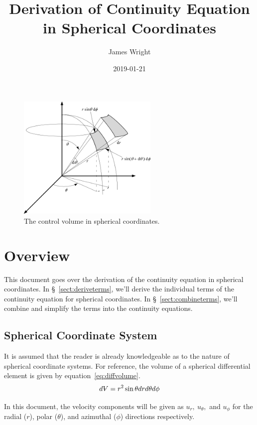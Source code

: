 \documentclass[12pt, letterpaper, twoside]{article}
\title{Derivation of Continuity Equation in Spherical Coordinates}
\author{James Wright}
\date{2019-01-21}
\makeatletter
\DeclareRobustCommand{\volume}{\text{\volumedash}V}
\newcommand{\volumedash}{%
  \makebox[0pt][l]{%
    \ooalign{\hfil\hphantom{$\m@th V$}\hfil\cr\kern0.08em--\hfil\cr}%
  }%
}
\makeatother
\begin{document}
\maketitle

\begin{figure}[h]
    \centering
    \includegraphics[width=0.6\textwidth]{images/control-volume-spherical.png}
    \caption{The control volume in spherical coordinates.}
    \label{fig:controlvolume}
\end{figure}

\section{Overview}

This document goes over the derivation of the continuity equation in spherical coordinates. 
In \S~\ref{sect:deriveterms}, we'll derive the individual terms of the continuity equation for spherical coordinates.
In \S~\ref{sect:combineterms}, we'll combine and simplify the terms into the continuity equations.

\subsection{Spherical Coordinate System}
    It is assumed that the reader is already knowledgeable as to the nature of spherical coordinate systems.
    For reference, the volume of a spherical differential element is given by equation~\ref{eq:diffvolume}.
    \begin{equation}
        d\volume = r^2 \sin \theta dr d\theta d\phi
        \label{eq:diffvolume}
    \end{equation}

    In this document, the velocity components will be given as \(u_r,\ u_{\theta},\) and \(u_{\phi}\) for the radial (\(r\)), polar (\(\theta\)), and azimuthal (\(\phi\)) directions respectively.
\end{document}
